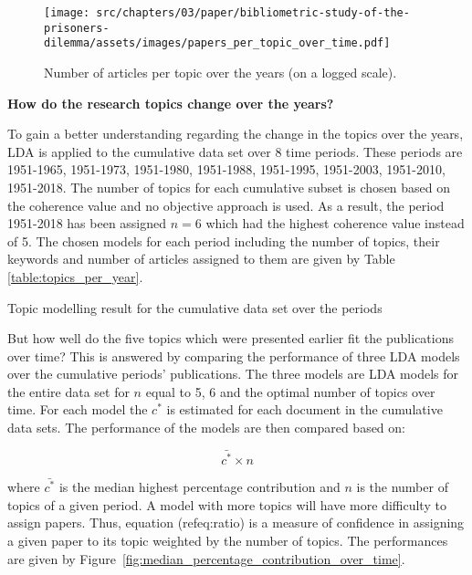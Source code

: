 \begin{figure}[!hbtp]
    \centering
    \texttt{[image: src/chapters/03/paper/bibliometric-study-of-the-prisoners-dilemma/assets/images/papers\_per\_topic\_over\_time.pdf]}
    \caption{Number of articles per topic over the years (on a logged scale).}\label{fig:number_of_articles_per_topic}
\end{figure}

\textbf{How do the research topics change over the years?}

To gain a better understanding regarding the change in the topics over the years,
LDA is applied to the cumulative data set over 8 time periods. These periods are
1951-1965, 1951-1973, 1951-1980, 1951-1988, 1951-1995, 1951-2003, 1951-2010,
1951-2018. The number of topics for each cumulative subset is chosen based on
the coherence value and no objective approach is used. As a result, the period
1951-2018 has been assigned \(n=6\) which had the highest coherence
value instead of 5. The chosen models for each period including the
number of topics, their keywords and number of articles assigned to them are
given by Table \ref{table:topics_per_year}.

\begin{table}[!hbtp]
    \begin{center}
    \resizebox{\textwidth}{!}{
    }
    \end{center}
    \caption{Topic modelling result for the cumulative data set over the periods
    }\label{table:topics_per_year}
\end{table}

But how well do the five topics which were presented earlier fit the
publications over time? This is answered by comparing the performance of three
LDA models over the cumulative periods' publications. The three models are LDA
models for the entire data set for \(n\) equal to 5, 6 and the optimal number of topics over time. For
each model the \(c^*\) is estimated for each document in the cumulative data
sets. The performance of the models are then compared based on:

\begin{equation}\label{eq:ratio}
    \bar{c^*} \times n
\end{equation}

where \(\bar{c^*}\) is the median highest percentage contribution and \(n\)
is the number of topics of a given period. A model with more topics will have more
difficulty to assign papers. Thus, equation (ref{eq:ratio}) is a measure of confidence
in assigning a given paper to its topic weighted by the number of topics.
The performances are
given by Figure~\ref{fig:median_percentage_contribution_over_time}.

